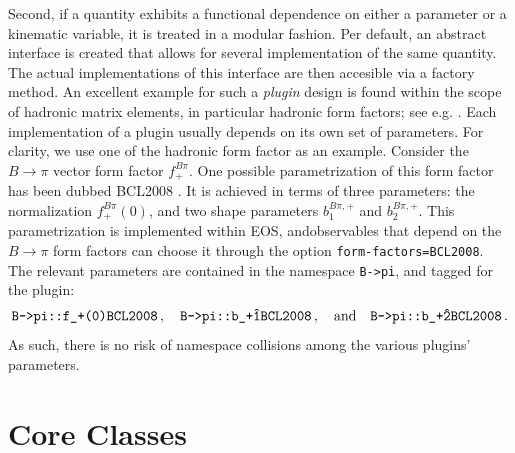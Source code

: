 Second, if a quantity exhibits a functional dependence on either a parameter or a kinematic variable,
it is treated in a modular fashion. Per default, an abstract interface is created that allows for
several implementation of the same quantity. The actual implementations of this interface are then
accesible via a factory method. An excellent example for such a \emph{plugin} design is found within
the scope of hadronic matrix elements, in particular hadronic form factors; see e.g.
. Each implementation of a plugin usually depends on its own set of
parameters. For clarity, we use one of the hadronic form factor as an example. Consider the $B\to
\pi$ vector form factor $f^{B\pi}_+$. One possible
parametrization of this form factor has been dubbed BCL2008 \cite{Bourrely:2008za}. It is achieved in terms of
three parameters: the normalization $f^{B\pi}_+(0)$, and two shape parameters $b^{B\pi,+}_1$ and
$b^{B\pi,+}_2$. This parametrization is implemented within EOS, andobservables that depend on the
$B\to \pi$ form factors can choose it through the option \texttt{form-factors=BCL2008}. The relevant
parameters are contained in the namespace \texttt{B->pi}, and tagged for the  plugin:
\begin{equation}
    \texttt{B->pi::f\_+(0)\@BCL2008}\,,\quad\texttt{B->pi::b\_+\^1\@BCL2008}\,,
    \quad\text{and}\quad\texttt{B->pi::b\_+\^2\@BCL2008}\,.
\end{equation}
As such, there is no risk of namespace collisions among the various plugins' parameters.\\


%


\section{Core Classes}
\label{sec:interface:classes}

